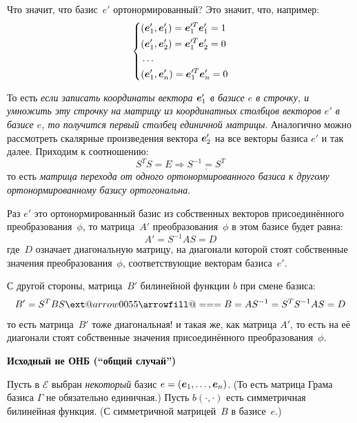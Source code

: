 \documentclass[a4paper,12pt]{article}
\makeatletter
\newcommand*{\Relbarfill@}{\arrowfill@\Relbar\Relbar\Relbar}
\newcommand*{\xeq}[2][]{\ext@arrow 0055\Relbarfill@{#1}{#2}}
\theoremstyle{remark}
\makeatother
\begin{document}
  Что значит, что базис~$e'$ ортонормированный?
  Это значит, что, например:
  \begin{equation}\label{eq:orthogo-vectors-in-basis}
    \left\{
      \begin{aligned}
        &(\boldsymbol e_1', \boldsymbol e_1') = \boldsymbol e_1^{\prime T} \boldsymbol e_1' = 1\\
        &(\boldsymbol e_1', \boldsymbol e_2') = \boldsymbol e_1^{\prime T} \boldsymbol e_2' = 0\\
        &\ldots\\
        &(\boldsymbol e_1', \boldsymbol e_n') = \boldsymbol e_1^{\prime T} \boldsymbol e_n' = 0\\
      \end{aligned}
    \right.
  \end{equation}
  
  То есть \emph{если записать координаты вектора $\boldsymbol e_1'$ в базисе $e$ в строчку, и умножить эту строчку на матрицу из координатных столбцов векторов $e'$ в базисе $e$, то получится первый столбец единичной матрицы}.
  Аналогично можно рассмотреть скалярные произведения вектора $\boldsymbol e_2'$ на все векторы базиса $e'$ и так далее.
  Приходим к соотношению:
  \begin{equation}\label{eq:matrix-fr}
    S^T S = E \Rightarrow \underline{S^{-1} = S^T}
  \end{equation}
  то есть \emph{матрица перехода от одного ортонормированного базиса к другому ортонормированному базису ортогональна}.
  
  Раз $e'$ это ортонормированный базис из собственных векторов присоединённого преобразования~$\phi$, то матрица~$A'$ преобразования~$\phi$ в этом базисе будет равна:
  \[
    A' = S^{-1} A S = D
  \]
  где~$D$ означает диагональную матрицу, на диагонали которой стоят собственные значения преобразования~$\phi$, соответствующие векторам базиса~$e'$.
  
  С другой стороны, матрица~$B'$ билинейной функции $b$ при смене базиса:
  \begin{equation}\label{eq:diag-bili-in-new-basis}
    B' = S^T B S \xeq[B = A]{S^{-1} = S^T} S^{-1} A S = D
  \end{equation}
  то есть матрица~$B'$ тоже диагональная!
  и такая же, как матрица $A'$, то есть на её диагонали стоят собственные значения присоединённого преобразования~$\phi$.


  \bigskip
  \noindent
  \textbf{Исходный не ОНБ (``общий случай'')}
  
  Пусть в $\mathcal E$ выбран \emph{некоторый} базис $e \hm= (\bds e_1, \ldots, \bds e_n)$.
  (То есть матрица Грама базиса $\Gamma$ не обязательно единичная.)
  Пусть $b(\cdot, \cdot)$ есть симметричная билинейная функция.
  (С симметричной матрицей~$B$ в базисе~$e$.)
  
\end{document}
